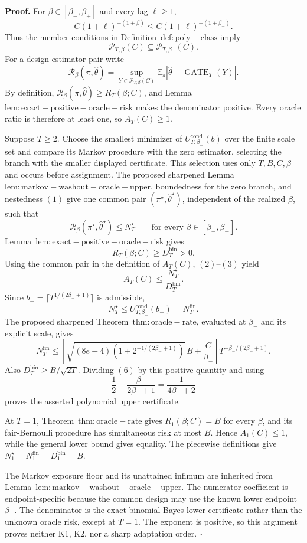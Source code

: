 \textbf{Proof.} For \(\beta\in[\beta_-,\beta_+]\) and every lag \(\ell\ge1\),
\[
C(1+\ell)^{-(1+\beta)}\le C(1+\ell)^{-(1+\beta_-)}.
\]
Thus the member conditions in Definition~\(\mathrm{def:poly-class}\) imply
\[
\mathcal P_{T,\beta}(C)\subseteq\mathcal P_{T,\beta_-}(C).
\tag{1}
\]
For a design-estimator pair write
\[
\mathcal R_\beta(\pi,\widehat\theta)=\sup_{Y\in\mathcal P_{T,\beta}(C)}\mathbb E_\pi|\widehat\theta-\operatorname{GATE}_T(Y)|.
\]
By definition, \(\mathcal R_\beta(\pi,\widehat\theta)\ge R_T(\beta;C)\), and Lemma~\(\mathrm{lem:exact-positive-oracle-risk}\) makes the denominator positive. Every oracle ratio is therefore at least one, so \(A_T(C)\ge1\).

Suppose \(T\ge2\). Choose the smallest minimizer of \(U_{T,\beta_-}^{\mathrm{cond}}(b)\) over the finite scale set and compare its Markov procedure with the zero estimator, selecting the branch with the smaller displayed certificate. This selection uses only \(T,B,C,\beta_-\) and occurs before assignment. The proposed sharpened Lemma~\(\mathrm{lem:markov-washout-oracle-upper}\), boundedness for the zero branch, and nestedness \((1)\) give one common pair \((\pi^\star,\widehat\theta^\star)\), independent of the realized \(\beta\), such that
\[
\mathcal R_\beta(\pi^\star,\widehat\theta^\star)\le N_T^\star
\qquad\text{for every }\beta\in[\beta_-,\beta_+].
\tag{2}
\]
Lemma~\(\mathrm{lem:exact-positive-oracle-risk}\) gives
\[
R_T(\beta;C)\ge D_T^{\mathrm{bin}}>0.
\tag{3}
\]
Using the common pair in the definition of \(A_T(C)\), \((2)\)--\((3)\) yield
\[
A_T(C)\le\frac{N_T^\star}{D_T^{\mathrm{bin}}}.
\tag{4}
\]
Since \(b_-=\lceil T^{1/(2\beta_-+1)}\rceil\) is admissible,
\[
N_T^\star\le U_{T,\beta_-}^{\mathrm{cond}}(b_-)=N_T^{\mathrm{fin}}.
\tag{5}
\]
The proposed sharpened Theorem~\(\mathrm{thm:oracle-rate}\), evaluated at \(\beta_-\) and its explicit scale, gives
\[
N_T^{\mathrm{fin}}
\le\left[\sqrt{(8e-4)\left(1+2^{-1/(2\beta_-+1)}\right)}\,B+\frac C{\beta_-}\right]T^{-\beta_-/(2\beta_-+1)}.
\tag{6}
\]
Also \(D_T^{\mathrm{bin}}\ge B/\sqrt{2T}\). Dividing \((6)\) by this positive quantity and using
\[
\frac12-\frac{\beta_-}{2\beta_-+1}=\frac1{4\beta_-+2}
\]
proves the asserted polynomial upper certificate.

At \(T=1\), Theorem~\(\mathrm{thm:oracle-rate}\) gives \(R_1(\beta;C)=B\) for every \(\beta\), and its fair-Bernoulli procedure has simultaneous risk at most \(B\). Hence \(A_1(C)\le1\), while the general lower bound gives equality. The piecewise definitions give \(N_1^\star=N_1^{\mathrm{fin}}=D_1^{\mathrm{bin}}=B\).

The Markov exposure floor and its unattained infimum are inherited from Lemma~\(\mathrm{lem:markov-washout-oracle-upper}\). The numerator coefficient is endpoint-specific because the common design may use the known lower endpoint \(\beta_-\). The denominator is the exact binomial Bayes lower certificate rather than the unknown oracle risk, except at \(T=1\). The exponent is positive, so this argument proves neither K1, K2, nor a sharp adaptation order. \(\square\)